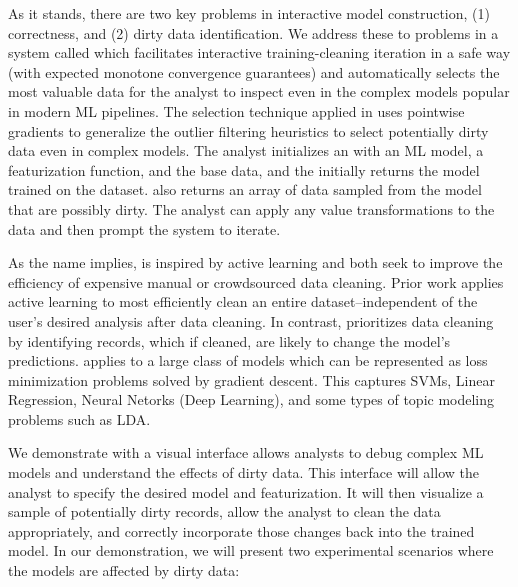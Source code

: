 As it stands, there are two key problems in interactive model construction, (1) correctness, and (2) dirty data identification.
We address these to problems in a system called \sys which facilitates interactive training-cleaning iteration in a safe way (with expected monotone convergence guarantees) and automatically selects the most valuable data for the analyst to inspect even in the complex models popular in modern ML pipelines.
The selection technique applied in \sys uses pointwise gradients to generalize the outlier filtering heuristics to select potentially dirty data even in complex models. 
The analyst initializes an \sys with an ML model, a featurization function, and the base data, and the \sys initially returns the model trained on the dataset.
\sys also returns an array of data sampled from the model that are possibly dirty.
The analyst can apply any value transformations to the data and then prompt the system to iterate. 

As the name implies, \sys is inspired by active learning and both seek to improve the efficiency of expensive manual or crowdsourced data cleaning.
Prior work applies active learning to most efficiently clean an entire dataset--independent of the user's desired analysis after data cleaning.
In contrast, \sys prioritizes data cleaning by identifying records, which if cleaned, are likely to change the model's predictions.
\sys applies to a large class of models which can be represented as loss minimization problems solved by gradient descent.
This captures SVMs, Linear Regression, Neural Netorks (Deep Learning), and some types of topic modeling problems such as LDA.

We demonstrate \sys with a visual interface allows analysts to debug complex ML models and understand the effects of dirty data.
This interface will allow the analyst to specify the desired model and featurization.
It will then visualize a sample of potentially dirty records, allow the analyst to clean the data appropriately, and correctly incorporate those changes back into the trained model.  
In our demonstration, we will present two experimental scenarios where the models are affected by dirty data: 

